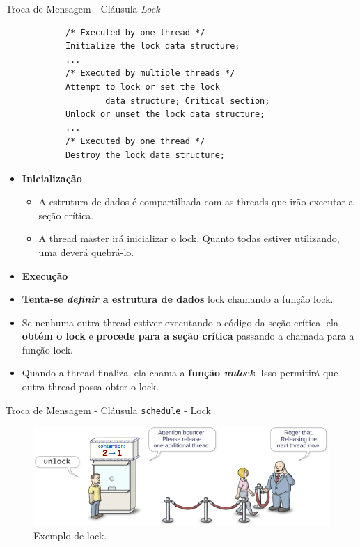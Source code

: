 	\begin{frame}[fragile]{Troca de Mensagem - Cláusula \textit{Lock}}
		\begin{multicols}{2}

		\begin{verbatim}
			/* Executed by one thread */
			Initialize the lock data structure;
			...
			/* Executed by multiple threads */
			Attempt to lock or set the lock 
					data structure; Critical section;
			Unlock or unset the lock data structure;
			...
			/* Executed by one thread */
			Destroy the lock data structure;
		\end{verbatim}
		\columnbreak
		\begin{itemize}
			\item \textbf{Inicialização}
			\begin{itemize}
				\item A estrutura de dados é compartilhada com as threads que irão executar a seção crítica.
				\item A thread master irá inicializar o lock. Quanto todas estiver utilizando, uma deverá quebrá-lo.
			\end{itemize}
			\item \textbf{Execução}
		\end{itemize}
		\end{multicols}

			\begin{itemize}
				\item \textbf{Tenta-se \textit{definir} a estrutura de dados} lock chamando a função lock.
				\item Se nenhuma outra thread estiver executando o código da seção crítica, ela \textbf{obtém o lock} e \textbf{procede para a seção crítica} passando a chamada para a função lock.
				\item Quando a thread finaliza, ela chama a \textbf{função \textit{unlock}}. Isso permitirá que outra thread possa obter o lock.
			\end{itemize}
\end{frame}

	\begin{frame}{Troca de Mensagem - Cláusula {\tt schedule} - Lock}
		\begin{figure}[p]
			\centering
			\includegraphics[width=1\textwidth]{img/pacheco/mutex.png}
			\caption{Exemplo de lock.}
		\end{figure}
	\end{frame}

